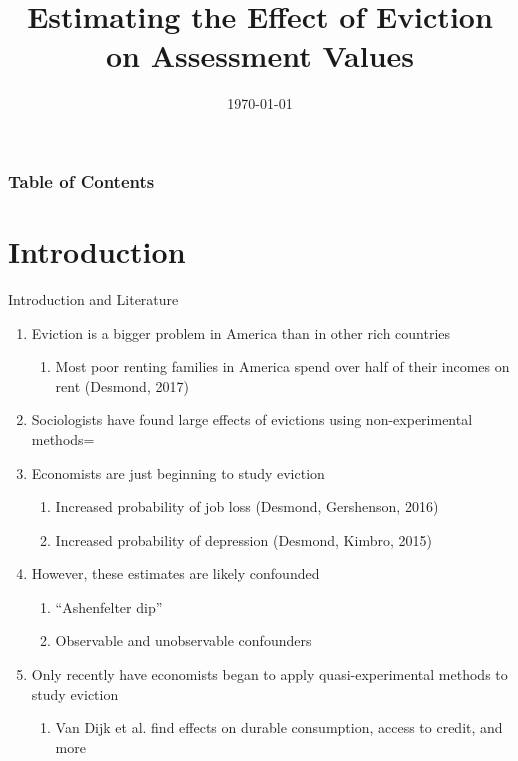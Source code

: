 \documentclass [xcolor=svgnames, t] {beamer}
\title[Eviction and Property Values]{Estimating the Effect of Eviction on Assessment Values}
\author[Arjun Shanmugam]{}
\date{\today}
\begin{document}
\begin{frame}
\maketitle
\end{frame}


\begin{frame}
\frametitle{Table of Contents}
\tableofcontents
\end{frame}

\section{Introduction}
\begin{frame}{Introduction and Literature}
   \begin{enumerate}
       \item Eviction is a bigger problem in America than in other rich countries
       \begin{enumerate}
           \item Most poor renting families in America
spend over half of their incomes on rent (Desmond, 2017)
       \end{enumerate}
       \item Sociologists have found large effects of evictions using non-experimental methods=
       \item Economists are just beginning to study eviction
       \begin{enumerate}
           \item Increased probability of job loss (Desmond, Gershenson, 2016)
           \item Increased probability of depression (Desmond, Kimbro, 2015)
       \end{enumerate} 
       \item However, these estimates are likely confounded
       \begin{enumerate}
           \item ``Ashenfelter dip''
           \item Observable and unobservable confounders
       \end{enumerate}
       \item Only recently have economists began to apply quasi-experimental methods to study eviction
        \begin{enumerate}
            \item Van Dijk et al. find effects on durable consumption, access to credit, and more
        \end{enumerate}
   \end{enumerate}
\end{frame}
\end{document}
